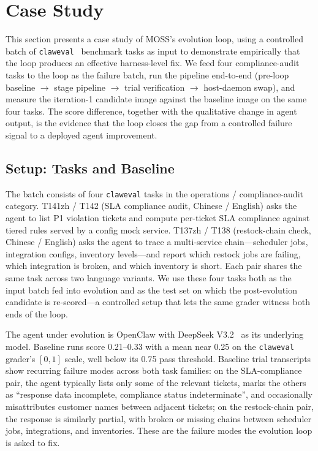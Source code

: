 \section{Case Study}
\label{sec:case-study}

This section presents a case study of MOSS's evolution loop, using a controlled batch of \texttt{claweval}~\citep{ye2026claw} benchmark tasks as input to demonstrate empirically that the loop produces an effective harness-level fix. We feed four compliance-audit tasks to the loop as the failure batch, run the pipeline end-to-end (pre-loop baseline $\rightarrow$ stage pipeline $\rightarrow$ trial verification $\rightarrow$ host-daemon swap), and measure the iteration-1 candidate image against the baseline image on the same four tasks. The score difference, together with the qualitative change in agent output, is the evidence that the loop closes the gap from a controlled failure signal to a deployed agent improvement.

\subsection{Setup: Tasks and Baseline}
\label{subsec:case-setup}

The batch consists of four \texttt{claweval} tasks in the operations / compliance-audit category. T141zh / T142 (SLA compliance audit, Chinese / English) asks the agent to list P1 violation tickets and compute per-ticket SLA compliance against tiered rules served by a config mock service. T137zh / T138 (restock-chain check, Chinese / English) asks the agent to trace a multi-service chain---scheduler jobs, integration configs, inventory levels---and report which restock jobs are failing, which integration is broken, and which inventory is short. Each pair shares the same task across two language variants. We use these four tasks both as the input batch fed into evolution and as the test set on which the post-evolution candidate is re-scored---a controlled setup that lets the same grader witness both ends of the loop.

The agent under evolution is OpenClaw with DeepSeek V3.2~\citep{liu2025deepseek} as its underlying model. Baseline runs score 0.21--0.33 with a mean near 0.25 on the \texttt{claweval} grader's $[0,1]$ scale, well below its 0.75 pass threshold. Baseline trial transcripts show recurring failure modes across both task families: on the SLA-compliance pair, the agent typically lists only some of the relevant tickets, marks the others as ``response data incomplete, compliance status indeterminate'', and occasionally misattributes customer names between adjacent tickets; on the restock-chain pair, the response is similarly partial, with broken or missing chains between scheduler jobs, integrations, and inventories. These are the failure modes the evolution loop is asked to fix.

